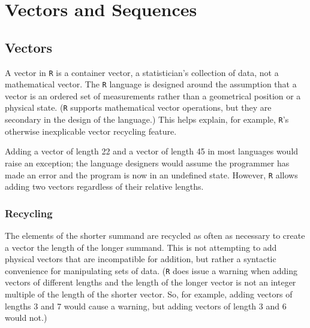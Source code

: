 \documentclass[a4paper,12pt]{article}
\begin{document}

\newpage
\section{Vectors and Sequences}
\subsection{Vectors}




A vector in \texttt{R} is a container vector, a statistician's collection of data, not a mathematical vector. The \texttt{R} language is designed around the assumption that a vector is an ordered set of measurements rather than a geometrical position or a physical state. (\texttt{R} supports mathematical vector operations, but they are secondary in the design of the language.) This helps explain, for example, \texttt{R}'s otherwise inexplicable vector recycling feature.

Adding a vector of length 22 and a vector of length 45 in most languages would raise an exception; the language designers would assume the programmer has made an error and the program is now in an undefined state. However, \texttt{R} allows adding two vectors regardless of their relative lengths.

\subsubsection{Recycling}
 The elements of the shorter summand are recycled as often as necessary to create a vector the length of the longer summand. This is not attempting to add physical vectors that are incompatible for addition, but rather a syntactic convenience for manipulating sets of data. (\texttt{R} does issue a warning when adding vectors of different lengths and the length of the longer vector is not an integer multiple of the length of the shorter vector. So, for example, adding vectors of lengths 3 and 7 would cause a warning, but adding vectors of length 3 and 6 would not.)
\end{document}
